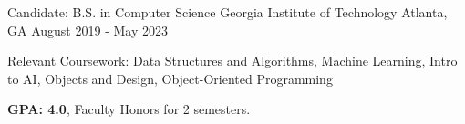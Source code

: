 


\begin{cventries}

\cventry
{Candidate: B.S. in Computer Science}
{Georgia Institute of Technology}
{Atlanta, GA}
{August 2019 - May 2023}
{\begin{cvitems}
\item {Relevant Coursework: Data Structures and Algorithms, Machine Learning, Intro to AI, Objects and Design, Object-Oriented Programming}
\item \textbf{GPA: 4.0}, Faculty Honors for 2 semesters.
\end{cvitems}
}


\end{cventries}

